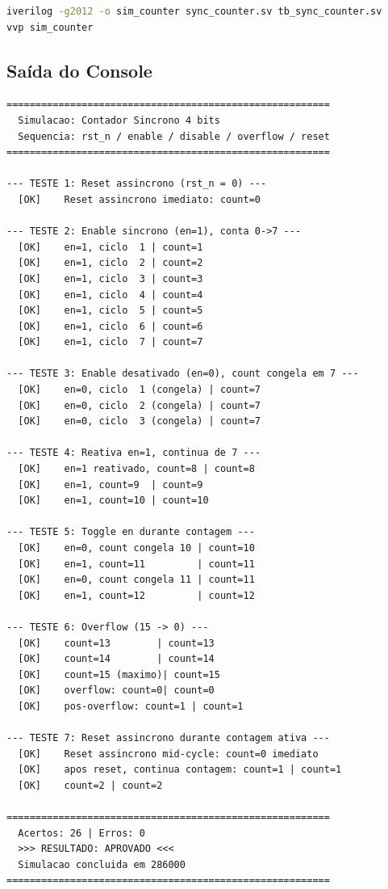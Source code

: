 \documentclass[12pt,a4paper]{article}
\begin{document}
\begin{lstlisting}[language=bash, caption={Compilação e execução},
                   label={lst:cmd}, numbers=none]
iverilog -g2012 -o sim_counter sync_counter.sv tb_sync_counter.sv
vvp sim_counter
\end{lstlisting}

\subsection{Saída do Console}

\begin{lstlisting}[language={},
  caption={Log completo da simulação (26/26 verificações corretas)},
  label={lst:log},
  numbers=none, frame=single, backgroundcolor=\color{cinzaclaro},
  basicstyle=\ttfamily\scriptsize]
========================================================
  Simulacao: Contador Sincrono 4 bits
  Sequencia: rst_n / enable / disable / overflow / reset
========================================================

--- TESTE 1: Reset assincrono (rst_n = 0) ---
  [OK]    Reset assincrono imediato: count=0

--- TESTE 2: Enable sincrono (en=1), conta 0->7 ---
  [OK]    en=1, ciclo  1 | count=1
  [OK]    en=1, ciclo  2 | count=2
  [OK]    en=1, ciclo  3 | count=3
  [OK]    en=1, ciclo  4 | count=4
  [OK]    en=1, ciclo  5 | count=5
  [OK]    en=1, ciclo  6 | count=6
  [OK]    en=1, ciclo  7 | count=7

--- TESTE 3: Enable desativado (en=0), count congela em 7 ---
  [OK]    en=0, ciclo  1 (congela) | count=7
  [OK]    en=0, ciclo  2 (congela) | count=7
  [OK]    en=0, ciclo  3 (congela) | count=7

--- TESTE 4: Reativa en=1, continua de 7 ---
  [OK]    en=1 reativado, count=8 | count=8
  [OK]    en=1, count=9  | count=9
  [OK]    en=1, count=10 | count=10

--- TESTE 5: Toggle en durante contagem ---
  [OK]    en=0, count congela 10 | count=10
  [OK]    en=1, count=11         | count=11
  [OK]    en=0, count congela 11 | count=11
  [OK]    en=1, count=12         | count=12

--- TESTE 6: Overflow (15 -> 0) ---
  [OK]    count=13        | count=13
  [OK]    count=14        | count=14
  [OK]    count=15 (maximo)| count=15
  [OK]    overflow: count=0| count=0
  [OK]    pos-overflow: count=1 | count=1

--- TESTE 7: Reset assincrono durante contagem ativa ---
  [OK]    Reset assincrono mid-cycle: count=0 imediato
  [OK]    apos reset, continua contagem: count=1 | count=1
  [OK]    count=2 | count=2

========================================================
  Acertos: 26 | Erros: 0
  >>> RESULTADO: APROVADO <<<
  Simulacao concluida em 286000
========================================================
\end{lstlisting}
\end{document}
